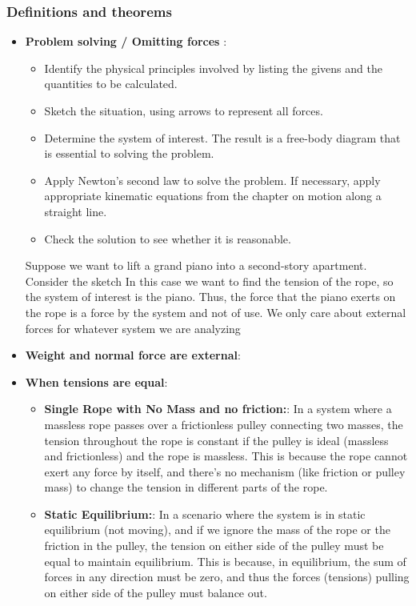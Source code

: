 \documentclass{report}
\begin{document}
    \subsubsection{Definitions and theorems}
    \begin{itemize}
        \item \textbf{Problem solving / Omitting forces }: 
            \begin{itemize}
                \item Identify the physical principles involved by listing the givens and the quantities to be calculated.
                \item Sketch the situation, using arrows to represent all forces.
                \item Determine the system of interest. The result is a free-body diagram that is essential to solving the problem.
                \item Apply Newton’s second law to solve the problem. If necessary, apply appropriate kinematic equations from the chapter on motion along a straight line.
                \item Check the solution to see whether it is reasonable.
            \end{itemize}
            Suppose we want to lift a grand piano into a second-story apartment. Consider the sketch
            \bigbreak \noindent
            \bigbreak \noindent 
            In this case we want to find the tension of the rope, so the system of interest is the piano. Thus, the force that the piano exerts on the rope is a force by the system and not of use. We only care about external forces for whatever system we are analyzing
        \item \textbf{Weight and normal force are external}:
        \item \textbf{When tensions are equal}:
            \begin{itemize}
                \item \textbf{Single Rope with No Mass and no friction:}: In a system where a massless rope passes over a frictionless pulley connecting two masses, the tension throughout the rope is constant if the pulley is ideal (massless and frictionless) and the rope is massless. This is because the rope cannot exert any force by itself, and there's no mechanism (like friction or pulley mass) to change the tension in different parts of the rope.
                \item \textbf{Static Equilibrium:}: In a scenario where the system is in static equilibrium (not moving), and if we ignore the mass of the rope or the friction in the pulley, the tension on either side of the pulley must be equal to maintain equilibrium. This is because, in equilibrium, the sum of forces in any direction must be zero, and thus the forces (tensions) pulling on either side of the pulley must balance out.

\end{itemize}
\end{itemize}
\end{document}
